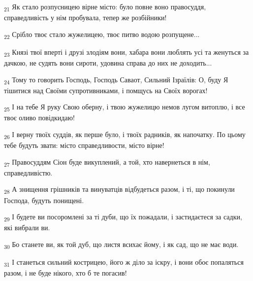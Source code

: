 \begin{tcolorbox}
\textsubscript{21} Як стало розпусницею вірне місто: було повне воно правосуддя, справедливість у нім пробувала, тепер же розбійники!
\end{tcolorbox}
\begin{tcolorbox}
\textsubscript{22} Срібло твоє стало жужелицею, твоє питво водою розпущене...
\end{tcolorbox}
\begin{tcolorbox}
\textsubscript{23} Князі твої вперті і друзі злодіям вони, хабара вони люблять усі та женуться за дачкою, не судять вони сироти, удовина справа до них не доходить...
\end{tcolorbox}
\begin{tcolorbox}
\textsubscript{24} Тому то говорить Господь, Господь Саваот, Сильний Ізраїлів: О, буду Я тішитися над Своїми супротивниками, і помщусь на Своїх ворогах!
\end{tcolorbox}
\begin{tcolorbox}
\textsubscript{25} І на тебе Я руку Свою оберну, і твою жужелицю немов лугом витоплю, і все твоє оливо повідкидаю!
\end{tcolorbox}
\begin{tcolorbox}
\textsubscript{26} І верну твоїх суддів, як перше було, і твоїх радників, як напочатку. По цьому тебе будуть звати: місто справедливости, місто вірне!
\end{tcolorbox}
\begin{tcolorbox}
\textsubscript{27} Правосуддям Сіон буде викуплений, а той, хто навернеться в нім, справедливістю.
\end{tcolorbox}
\begin{tcolorbox}
\textsubscript{28} А знищення грішників та винуватців відбудеться разом, і ті, що покинули Господа, будуть понищені.
\end{tcolorbox}
\begin{tcolorbox}
\textsubscript{29} І будете ви посоромлені за ті дуби, що їх пожадали, і застидаєтеся за садки, які вибрали ви.
\end{tcolorbox}
\begin{tcolorbox}
\textsubscript{30} Бо станете ви, як той дуб, що листя всихає йому, і як сад, що не має води.
\end{tcolorbox}
\begin{tcolorbox}
\textsubscript{31} І станеться сильний кострицею, його ж діло за іскру, і вони обоє попаляться разом, і не буде нікого, хто б те погасив!
\end{tcolorbox}
